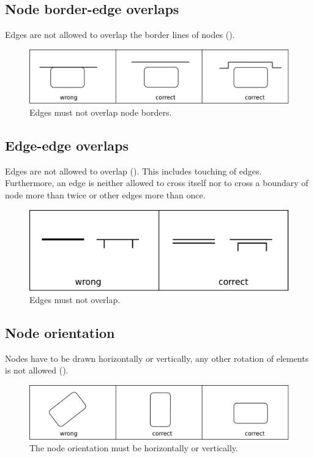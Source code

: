 \subsection{Node border-edge overlaps}

Edges are not allowed to overlap the border lines of nodes ().

\begin{figure}[htb]
  \centering
  \includegraphics[scale=0.3]{images/layout-node-border-edge}
  \caption{Edges must not overlap node borders.}\label{fig:layout3}
\end{figure}

\subsection{Edge-edge overlaps}

Edges are not allowed to overlap (). This includes touching of edges.
Furthermore, an edge is neither allowed to cross itself nor to cross
a boundary of node more than twice or other edges more than once.

\begin{figure}[htb]
  \centering
  \includegraphics[scale=0.3]{images/layout-edge-edge}
  \caption{Edges must not overlap.}\label{fig:layout4}
\end{figure}

\subsection{Node orientation}

Nodes have to be drawn horizontally or vertically, any other
rotation of elements is not allowed ().

\begin{figure}[htb]
  \centering
  \includegraphics[scale=0.3]{images/layout-orientation}
  \caption{The node orientation must be horizontally or
  vertically.}\label{fig:layout5}
\end{figure}

